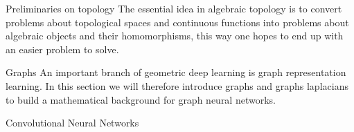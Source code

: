 \documentclass[12pt,a4paper]{report}
\theoremstyle{plain}
\theoremstyle{definition}
\theoremstyle{remark}
\begin{document}
    \begin{titlepage}
        
    \end{titlepage}
    \tableofcontents
    \newpage
    \begin{chapter}{Preliminaries on topology}
        \label{ch:1}
        The essential idea in algebraic topology is to convert problems about topological spaces and continuous functions into
        problems about algebraic objects and their homomorphisms, this way one hopes to end up with an easier problem to solve. 
        
    \end{chapter}
    \begin{chapter}{Graphs}
        \label{ch:2}
        An important branch of geometric deep learning is graph representation learning. In this section we will therefore
        introduce graphs and graphs laplacians to build a mathematical background for graph neural networks. 
        
    \end{chapter}
    \begin{chapter}{Convolutional Neural Networks}
        \label{ch:3}
        
    \end{chapter}
    \newpage
\end{document}
